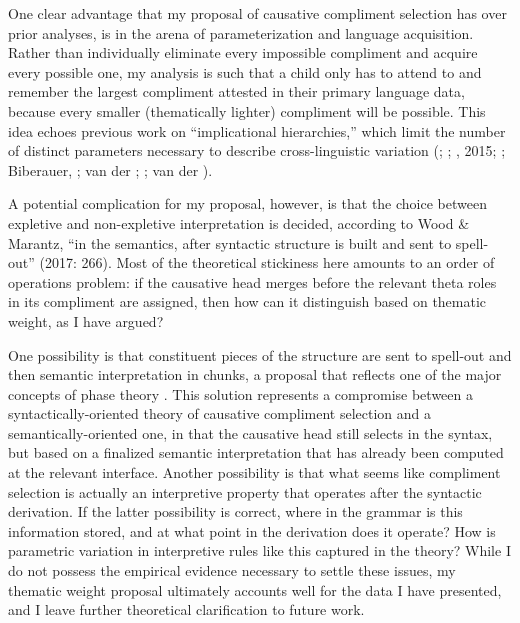 \documentclass[output=paper,modfonts,nonflat]{langsci/langscibook}
\begin{document}
One clear advantage that my proposal of causative compliment selection has over prior analyses, is in the arena of parameterization and language acquisition. Rather than individually eliminate every impossible compliment and acquire every possible one, my analysis is such that a child only has to attend to and remember the largest compliment attested in their primary language data, because every smaller (thematically lighter) compliment will be possible. This idea echoes previous work on “implicational hierarchies,” which limit the number of distinct parameters necessary to describe cross-linguistic variation (\citealt{HolmbergRoberts2009}; \citealt{Biberauer2011}; \citealt{BiberauerRoberts2012}, 2015; \citealt{Sheehan2013}; Biberauer, \citealt{RobertsSheehan2013}; van der \citealt{WalBiberauer2014}; \citealt{BiberauerEtAl2014}; van der \citealt{Wal2017}).

A potential complication for my proposal, however, is that the choice between expletive and non-expletive interpretation is decided, according to Wood \& Marantz, “in the semantics, after syntactic structure is built and sent to spell-out” (2017: 266). Most of the theoretical stickiness here amounts to an order of operations problem: if the causative head merges before the relevant theta roles in its compliment are assigned, then how can it distinguish based on thematic weight, as I have argued? 

\begin{styleDefault}
One possibility is that constituent pieces of the structure are sent to spell-out and then semantic interpretation in chunks, a proposal that reflects one of the major concepts of phase theory \citep{Chomsky1999}. This solution represents a compromise between a syntactically-oriented theory of causative compliment selection and a semantically-oriented one, in that the causative head still selects in the syntax, but based on a finalized semantic interpretation that has already been computed at the relevant interface. Another possibility is that what seems like compliment selection is actually an interpretive property that operates after the syntactic derivation. If the latter possibility is correct, where in the grammar is this information stored, and at what point in the derivation does it operate? How is parametric variation in interpretive rules like this captured in the theory? While I do not possess the empirical evidence necessary to settle these issues, my thematic weight proposal ultimately accounts well for the data I have presented, and I leave further theoretical clarification to future work. 
\end{styleDefault}
\end{document}
